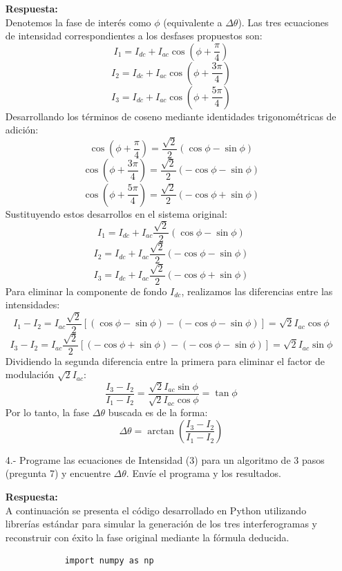 \documentclass[12pt,letterpaper]{article}
\begin{document}
\begin{enumerate}
		\vspace{0.3cm}
		\textbf{Respuesta:} \\
		Denotemos la fase de interés como $\phi$ (equivalente a $\Delta\theta$). Las tres ecuaciones de intensidad correspondientes a los desfases propuestos son:
		\[ I_1 = I_{dc} + I_{ac} \cos\left(\phi + \frac{\pi}{4}\right) \]
		\[ I_2 = I_{dc} + I_{ac} \cos\left(\phi + \frac{3\pi}{4}\right) \]
		\[ I_3 = I_{dc} + I_{ac} \cos\left(\phi + \frac{5\pi}{4}\right) \]
		Desarrollando los términos de coseno mediante identidades trigonométricas de adición:
		\[ \cos\left(\phi + \frac{\pi}{4}\right) = \frac{\sqrt{2}}{2}(\cos\phi - \sin\phi) \]
		\[ \cos\left(\phi + \frac{3\pi}{4}\right) = \frac{\sqrt{2}}{2}(-\cos\phi - \sin\phi) \]
		\[ \cos\left(\phi + \frac{5\pi}{4}\right) = \frac{\sqrt{2}}{2}(-\cos\phi + \sin\phi) \]
		Sustituyendo estos desarrollos en el sistema original:
		\[ I_1 = I_{dc} + I_{ac} \frac{\sqrt{2}}{2}(\cos\phi - \sin\phi) \]
		\[ I_2 = I_{dc} + I_{ac} \frac{\sqrt{2}}{2}(-\cos\phi - \sin\phi) \]
		\[ I_3 = I_{dc} + I_{ac} \frac{\sqrt{2}}{2}(-\cos\phi + \sin\phi) \]
		Para eliminar la componente de fondo $I_{dc}$, realizamos las diferencias entre las intensidades:
		\[ I_1 - I_2 = I_{ac} \frac{\sqrt{2}}{2} \left[ (\cos\phi - \sin\phi) - (-\cos\phi - \sin\phi) \right] = \sqrt{2} I_{ac} \cos\phi \]
		\[ I_3 - I_2 = I_{ac} \frac{\sqrt{2}}{2} \left[ (-\cos\phi + \sin\phi) - (-\cos\phi - \sin\phi) \right] = \sqrt{2} I_{ac} \sin\phi \]
		Dividiendo la segunda diferencia entre la primera para eliminar el factor de modulación $\sqrt{2}I_{ac}$:
		\[ \frac{I_3 - I_2}{I_1 - I_2} = \frac{\sqrt{2} I_{ac} \sin\phi}{\sqrt{2} I_{ac} \cos\phi} = \tan\phi \]
		Por lo tanto, la fase $\Delta\theta$ buscada es de la forma:
		\[ \Delta\theta = \arctan\left(\frac{I_3 - I_2}{I_1 - I_2}\right) \]
		\vspace{0.5cm}
		
		\item[4.-] Programe las ecuaciones de Intensidad (3) para un algoritmo de 3 pasos (pregunta 7) y encuentre $\Delta\theta$. Envíe el programa y los resultados.
		
		\vspace{0.3cm}
		\textbf{Respuesta:} \\
		A continuación se presenta el código desarrollado en Python utilizando librerías estándar para simular la generación de los tres interferogramas y reconstruir con éxito la fase original mediante la fórmula deducida.
		
		\begin{verbatim}
			import numpy as np
			

\end{verbatim}
\end{enumerate}
\end{document}
